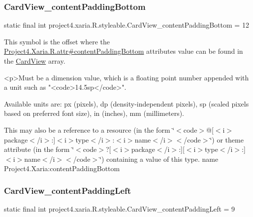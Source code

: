 \subsubsection{\texorpdfstring{Card\+View\+\_\+content\+Padding\+Bottom}{CardView\_contentPaddingBottom}}
{\footnotesize\ttfamily static final int project4.\+xaria.\+R.\+styleable.\+Card\+View\+\_\+content\+Padding\+Bottom = 12\hspace{0.3cm}{\ttfamily [static]}}

This symbol is the offset where the \hyperlink{}{Project4.\+Xaria.\+R.\+attr\#content\+Padding\+Bottom} attribute\textquotesingle{}s value can be found in the \hyperlink{classproject4_1_1xaria_1_1R_1_1styleable_abef2e3d3e2b11dd786470094dbc57ea4}{Card\+View} array.

\begin{DoxyVerb}      <p>Must be a dimension value, which is a floating point number appended with a unit such as "<code>14.5sp</code>".
\end{DoxyVerb}
 Available units are\+: px (pixels), dp (density-\/independent pixels), sp (scaled pixels based on preferred font size), in (inches), mm (millimeters). 

This may also be a reference to a resource (in the form \char`\"{}$<$code$>$@\mbox{[}$<$i$>$package$<$/i$>$\+:\mbox{]}$<$i$>$type$<$/i$>$\+:$<$i$>$name$<$/i$>$$<$/code$>$\char`\"{}) or theme attribute (in the form \char`\"{}$<$code$>$?\mbox{[}$<$i$>$package$<$/i$>$\+:\mbox{]}\mbox{[}$<$i$>$type$<$/i$>$\+:\mbox{]}$<$i$>$name$<$/i$>$$<$/code$>$\char`\"{}) containing a value of this type.  name Project4.\+Xaria\+:content\+Padding\+Bottom \mbox{\label{classproject4_1_1xaria_1_1R_1_1styleable_a8e9c7e0442a01fba035b5de476459104}} 
\subsubsection{\texorpdfstring{Card\+View\+\_\+content\+Padding\+Left}{CardView\_contentPaddingLeft}}
{\footnotesize\ttfamily static final int project4.\+xaria.\+R.\+styleable.\+Card\+View\+\_\+content\+Padding\+Left = 9\hspace{0.3cm}{\ttfamily [static]}}

